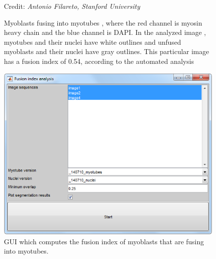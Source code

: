 \documentclass[a4paper, oneside, onecolumn, 11pt]{article}
\newcommand{\credit}[1]{\raggedleft \scriptsize Credit:\emph{ #1}}
\begin{document}
\begin{figure}[!htb]
\begin{center}
\credit{Antonio Filareto, Stanford University}\\
\qquad
{}
\caption{Myoblasts fusing into myotubes \protect{}, where the red channel is myosin heavy chain and the blue channel is DAPI. In the analyzed image \protect{}, myotubes and their nuclei have white outlines and unfused myoblasts and their nuclei have gray outlines. This particular image has a fusion index of 0.54, according to the automated analysis}
\label{fig:myotubes}
\end{center}
\end{figure}

\begin{figure}[!htb]
\begin{center}
\includegraphics[width = 0.5\columnwidth]{figures/fusionIndexGUI}
\caption{GUI which computes the fusion index of myoblasts that are fusing into myotubes.}
\label{fig:fusion-index-GUI}
\end{center}
\end{figure}
\end{document}
